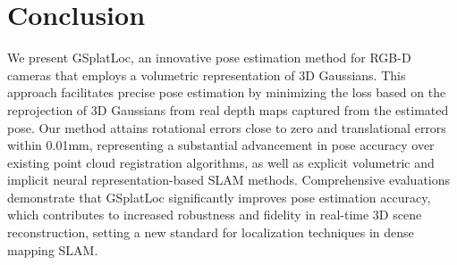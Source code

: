 \documentclass[twocolumn]{article} %
\begin{document}
\section{Conclusion}\label{conclusion}

We present GSplatLoc, an innovative pose estimation method for RGB-D
cameras that employs a volumetric representation of 3D Gaussians. This
approach facilitates precise pose estimation by minimizing the loss
based on the reprojection of 3D Gaussians from real depth maps captured
from the estimated pose. Our method attains rotational errors close to
zero and translational errors within 0.01mm, representing a substantial
advancement in pose accuracy over existing point cloud registration
algorithms, as well as explicit volumetric and implicit neural
representation-based SLAM methods. Comprehensive evaluations demonstrate
that GSplatLoc significantly improves pose estimation accuracy, which
contributes to increased robustness and fidelity in real-time 3D scene
reconstruction, setting a new standard for localization techniques in
dense mapping SLAM.
\end{document}

